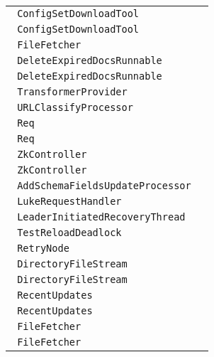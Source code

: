 \begin{center}
\begin{tabular}{ll}
\lstinline/ ConfigSetDownloadTool/&\raisebox{0pt}{\lstinline/   runImpl(CommandLine)/}\\ 
\lstinline/ ConfigSetDownloadTool/&\raisebox{0pt}{\lstinline/   runImpl(CommandLine)/}\\ 
\lstinline/ FileFetcher/&\raisebox{0pt}{\lstinline/   cleanup()/}\\ 
\lstinline/ DeleteExpiredDocsRunnable/&\raisebox{0pt}{\lstinline/   run()/}\\ 
\lstinline/ DeleteExpiredDocsRunnable/&\raisebox{0pt}{\lstinline/   run()/}\\ 
\lstinline/ TransformerProvider/&\raisebox{0pt}{\lstinline/   getTemplates()/}\\ 
\lstinline/ URLClassifyProcessor/&\raisebox{0pt}{\lstinline/   processAdd(AddUpdateCommand)/}\\ 
\lstinline/ Req/&\raisebox{0pt}{\lstinline/   trackRequestResult(HttpResponser,boolean)/}\\ 
\lstinline/ Req/&\raisebox{0pt}{\lstinline/   trackRequestResult(HttpResponser,boolean)/}\\ 
\lstinline/ ZkController/&\raisebox{0pt}{\lstinline/   publishNodeAsDown(String)/}\\ 
\lstinline/ ZkController/&\raisebox{0pt}{\lstinline/   publishNodeAsDown(String)/}\\ 
\lstinline/ AddSchemaFieldsUpdateProcessor/&\raisebox{0pt}{\lstinline/   processAdd(AddUpdateCommand)/}\\ 
\lstinline/ LukeRequestHandler/&\raisebox{0pt}{\lstinline/   longgetFileLength(Directory,String)/}\\ 
\lstinline/ LeaderInitiatedRecoveryThread/&\raisebox{0pt}{\lstinline/   publishDownState()/}\\ 
\lstinline/ TestReloadDeadlock/&\raisebox{0pt}{\lstinline/   run()/}\\ 
\lstinline/ RetryNode/&\raisebox{0pt}{\lstinline/   checkRetry()/}\\ 
\lstinline/ DirectoryFileStream/&\raisebox{0pt}{\lstinline/   write(out)/}\\ 
\lstinline/ DirectoryFileStream/&\raisebox{0pt}{\lstinline/   write(out)/}\\ 
\lstinline/ RecentUpdates/&\raisebox{0pt}{\lstinline/   update()/}\\ 
\lstinline/ RecentUpdates/&\raisebox{0pt}{\lstinline/   update()/}\\ 
\lstinline/ FileFetcher/&\raisebox{0pt}{\lstinline/   cleanup()/}\\ 
\lstinline/ FileFetcher/&\raisebox{0pt}{\lstinline/   cleanup()/}\\ 

\end{tabular}
\end{center}
